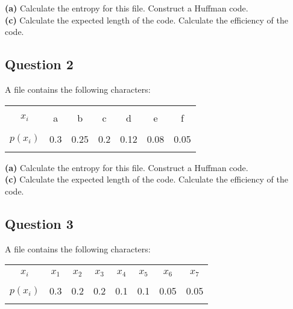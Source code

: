 \documentclass[a4paper,12pt]{article}
\begin{document}
{\bf(a)} Calculate the entropy for this file.  Construct a Huffman code. \quad \\{\bf(c)} Calculate the expected length of the code.  Calculate the efficiency of the code.



\subsection*{Question 2}

A file contains the following characters:\\[-0.1cm]
\begin{center}
	\begin{tabular}{|c|cccccc|}
		\hline
		&&&&&& \\[-0.4cm]
		$x_i$     & a & b & c & d & e & f\\[0.1cm]
		\hline
		&&&&&& \\[-0.4cm]
		$p(x_i)$  & 0.3 & 0.25 & 0.2 & 0.12 & 0.08 & 0.05 \\[0.1cm]
		\hline
		\multicolumn{7}{c}{}\\[-0.2cm]
	\end{tabular}
\end{center}

{\bf(a)} Calculate the entropy for this file.  Construct a Huffman code. \quad \\{\bf(c)} Calculate the expected length of the code.  Calculate the efficiency of the code.


\subsection*{Question 3}

A file contains the following characters:\\[-0.1cm]
\begin{center}
	\begin{tabular}{|c|ccccccc|}
		\hline
		&&&&&&& \\[-0.4cm]
		$x_i$     & $x_1$ & $x_2$ & $x_3$ & $x_4$ & $x_5$ & $x_6$ & $x_7$ \\[0.1cm]
		\hline
		&&&&&&& \\[-0.4cm]
		$p(x_i)$  & 0.3 & 0.2 & 0.2 & 0.1 & 0.1 & 0.05 & 0.05 \\[0.1cm]
		\hline
		\multicolumn{7}{c}{}\\[-0.2cm]
	\end{tabular}
\end{center}
\end{document}
